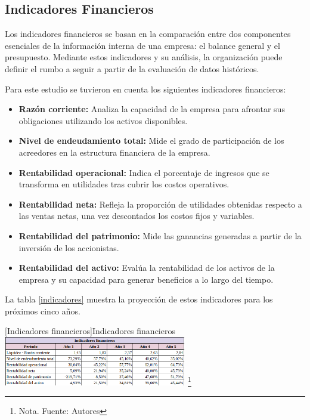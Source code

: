 \subsection{Indicadores Financieros}

Los indicadores financieros se basan en la comparación entre dos componentes esenciales de la información interna de una empresa: el balance general y el presupuesto. Mediante estos indicadores y su análisis, la organización puede definir el rumbo a seguir a partir de la evaluación de datos históricos.

Para este estudio se tuvieron en cuenta los siguientes indicadores financieros:

\begin{itemize}
    \item \textbf{Razón corriente:} Analiza la capacidad de la empresa para afrontar sus obligaciones utilizando los activos disponibles.
    \item \textbf{Nivel de endeudamiento total:} Mide el grado de participación de los acreedores en la estructura financiera de la empresa.
    \item \textbf{Rentabilidad operacional:} Indica el porcentaje de ingresos que se transforma en utilidades tras cubrir los costos operativos.
    \item \textbf{Rentabilidad neta:} Refleja la proporción de utilidades obtenidas respecto a las ventas netas, una vez descontados los costos fijos y variables.
    \item \textbf{Rentabilidad del patrimonio:} Mide las ganancias generadas a partir de la inversión de los accionistas.
    \item \textbf{Rentabilidad del activo:} Evalúa la rentabilidad de los activos de la empresa y su capacidad para generar beneficios a lo largo del tiempo.
\end{itemize}

La tabla \ref{indicadores} muestra la proyección de estos indicadores para los próximos cinco años.

\vspace{2mm}
\begin{minipage}{0.9\textwidth}
\centering
{}[{Indicadores financieros}]{Indicadores financieros}
\label{indicadores}
\includegraphics[width=0.6\textwidth]{Content/Images/AF/IndicadoresFinancieros.png}
\footnote{Nota. \textup{Fuente: Autores}}
\end{minipage}

